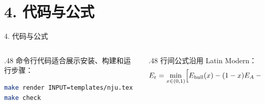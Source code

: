 \documentclass[aspectratio=169,10pt]{beamer}
\begin{document}
\section{4. 代码与公式}

\begin{frame}[fragile]{4. 代码与公式}
\begin{columns}[T,onlytextwidth]
  \begin{column}{.48\textwidth}
    命令行代码适合展示安装、构建和运行步骤：
\begin{lstlisting}[language=bash]
make render INPUT=templates/nju.tex
make check
\end{lstlisting}
  \end{column}
  \begin{column}{.48\textwidth}
    行间公式沿用 Latin Modern：
    \[
      E_{\mathrm{r}} = \min_{x\in(0,1)}
      \Bigl[E_{\mathrm{hull}}(x) - (1-x)E_A - xE_B\Bigr]
    \]
  \end{column}
\end{columns}
\end{frame}

\end{document}
